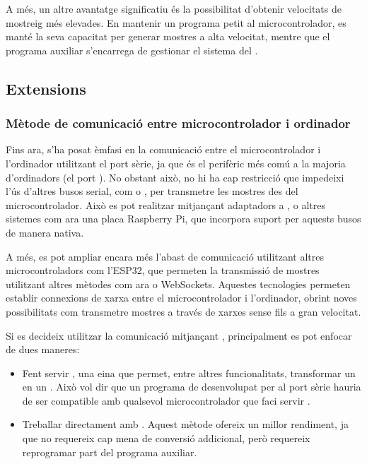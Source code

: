 \documentclass{tfgitic}[2023/07/07]
\begin{document}
A més, un altre avantatge significatiu és la possibilitat d'obtenir
velocitats de mostreig més elevades. En mantenir un programa petit al
microcontrolador, es manté la seva capacitat per generar mostres a
alta velocitat, mentre que el programa auxiliar s'encarrega de
gestionar el sistema del .

\subsection{Extensions}
\label{subsec:extensions-osplot-pc}

\subsubsection{Mètode de comunicació entre microcontrolador i ordinador}

Fins ara, s'ha posat èmfasi en la comunicació entre el
microcontrolador i l'ordinador utilitzant el port sèrie, ja que és el
perifèric més comú a la majoria d'ordinadors (el port ). No
obstant això, no hi ha cap restricció que impedeixi l'ús d'altres
busos serial, com  o , per transmetre les mostres
des del microcontrolador. Això es pot realitzar mitjançant adaptadors
a , o altres sistemes com ara una placa Raspberry Pi, que
incorpora suport per aquests busos de manera nativa.

A més, es pot ampliar encara més l'abast de comunicació utilitzant
altres microcontroladors com l'ESP32, que permeten la transmissió de
mostres utilitzant altres mètodes com ara  
o WebSockets. Aquestes tecnologies permeten establir connexions de
xarxa entre el microcontrolador i l'ordinador, obrint noves
possibilitats com transmetre mostres a través de xarxes sense fils a
gran velocitat.

Si es decideix utilitzar la comunicació mitjançant ,
principalment es pot enfocar de dues maneres:

\begin{itemize}
	\item Fent servir \cite[socat]{socat}, una eina que permet,
          entre altres funcionalitats, transformar un  en
          un . Això vol dir que un programa de 
          desenvolupat per al port sèrie hauria de ser compatible amb
          qualsevol microcontrolador que faci servir .
	\item Treballar directament amb . Aquest mètode
          ofereix un millor rendiment, ja que no requereix cap mena de
          conversió addicional, però requereix reprogramar part del
          programa auxiliar.
\end{itemize}
\end{document}
